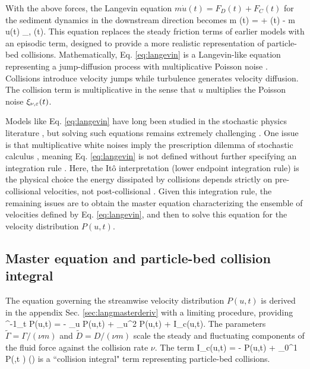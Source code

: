 With the above forces, the Langevin equation $m\dot{u}(t) = F_D(t) + F_C(t)$ for the sediment dynamics in the downstream direction becomes
\be m (t) = \Gamma + \eta(t) - m u(t) \xi_{\nu, \ve}(t). \label{eq:langevin} \ee
This equation replaces the steady friction terms of earlier models with an episodic term, designed to provide a more realistic representation of particle-bed collisions.
Mathematically, Eq. \ref{eq:langevin} is a Langevin-like equation representing a jump-diffusion process \citep{Daly2006} with multiplicative Poisson noise \citep{Dubkov2016,Denisov2009}. 
Collisions introduce velocity jumps while turbulence generates velocity diffusion. The collision term is multiplicative in the sense that $u$ multiplies the Poisson noise $\xi_{\nu,\varepsilon}(t)$.

Models like Eq. \ref{eq:langevin} have long been studied in the stochastic physics literature \citep{Hanggi1978,VanDenBroeck1983}, but solving such equations remains extremely challenging \citep{Daly2010,Mau2014,Dubkov2019}.
One issue is that multiplicative white noises imply the prescription dilemma of stochastic calculus \citep{Risken1989,Gardiner1983}, meaning Eq. \ref{eq:langevin} is not defined without further specifying an integration rule \citep{Suweis2011}.
Here, the It\^{o} interpretation (lower endpoint integration rule) is the physical choice the energy dissipated by collisions depends strictly on pre-collisional velocities, not post-collisional \citep[e.g.][]{Gardiner1983}.
Given this integration rule, the remaining issues are to obtain the master equation characterizing the ensemble of velocities defined by Eq. \ref{eq:langevin}, and then to solve this equation for the velocity distribution $P(u,t)$.

\subsection{Master equation and particle-bed collision integral}

The equation governing the streamwise velocity distribution $P(u,t)$ is derived in the appendix Sec. \ref{sec:langmasterderiv} with a limiting procedure, providing
\be \nu^{-1}\partial_t P(u,t) = - \tilde{\Gamma} \partial_u P(u,t) +  \partial_u^2 P(u,t) + I_c(u,t). \label{eq:master} \ee
The parameters $\tilde{\Gamma} = \Gamma/(\nu m)$ and $\tilde{D} = D/(\nu m)$ scale the steady and fluctuating components of the fluid force against the collision rate $\nu$. The term
\be I_c(u,t) = - P(u,t) + \int_0^1 P\big(,t \big) \rho(\ve) \label{eq:colint} \ee
is a ``collision integral" term representing particle-bed collisions.

